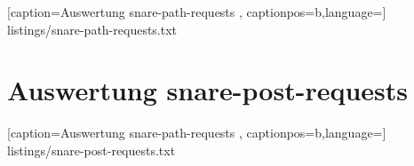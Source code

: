 
    [caption={Auswertung snare-path-requests}
       \label{lst:reverse_dns},
       captionpos=b,language={}]
 {listings/snare-path-requests.txt}
 
\newpage 
 
\section*{Auswertung snare-post-requests}
\label{app:Auswertung snare-post-requests}


    [caption={Auswertung snare-path-requests}
       \label{lst:reverse_dns},
       captionpos=b,language={}]
 {listings/snare-post-requests.txt}  